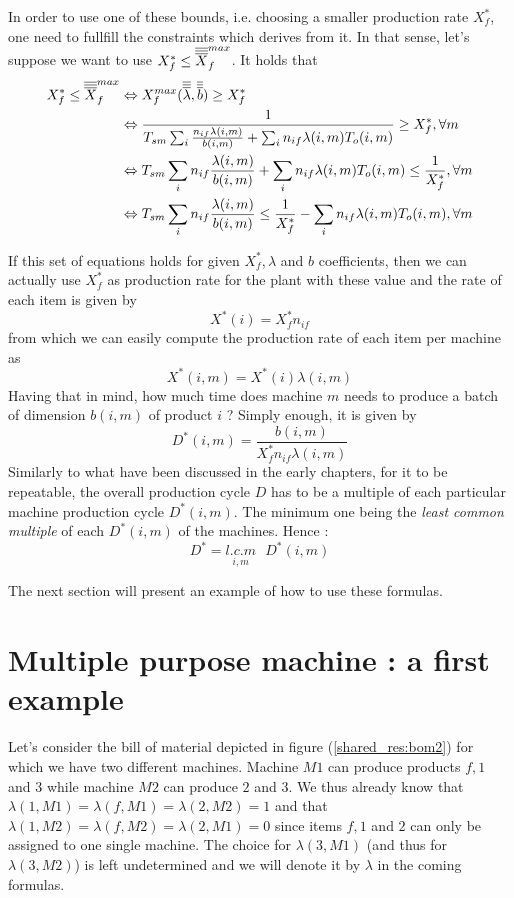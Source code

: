 In order to use one of these bounds, i.e. choosing a smaller production rate $X_f^*$, one need to fullfill the constraints which derives from it. In that sense, let's suppose we want to use $X_f^*\le \overline{\overline{\overline{X}}}_f^{max}$. It holds that 
\[
    \begin{split}
        X_f^*\le \overline{\overline{\overline{X}}}_f^{max}
        &\Leftrightarrow X_f^{max}(\overline{\overline{\overline{\lambda}}}, \overline{\overline{\overline{b}}}) \ge X_f^*\\
        &\Leftrightarrow \frac{1}{ T_{sm}\sum_i\frac{n_{if}\lambda(i,m)}{b(i,m)} + \sum_i n_{if}\lambda(i,m)T_o(i,m) } \ge X_f^*, \forall m\\
        &\Leftrightarrow T_{sm}\sum_i n_{if}\frac{\lambda(i,m)}{b(i,m)} + \sum_i n_{if}\lambda(i,m)T_o(i,m) \le \frac{1}{X_f^*}, \forall m\\
        &\Leftrightarrow T_{sm}\sum_i n_{if}\frac{\lambda(i,m)}{b(i,m)} \le \frac{1}{X_f^*} - \sum_i n_{if}\lambda(i,m)T_o(i,m), \forall m
    \end{split}
\]

If this set of equations holds for given $X_f^*, \lambda$ and $b$ coefficients, then we can actually use $X_f^*$ as production rate for the plant with these value and the rate of each item is given by \[ X^*(i) = X_f^*n_{if} \] from which we can easily compute the production rate of each item per machine as \[ X^*(i,m) = X^*(i)\lambda(i,m) \] Having that in mind, how much time does machine $m$ needs to produce a batch of dimension $b(i,m)$ of product $i$ ? Simply enough, it is given by \[ D^*(i,m) = \frac{b(i,m)}{X_f^*n_{if}\lambda(i,m)} \] Similarly to what have been discussed in the early chapters, for it to be repeatable, the overall production cycle $D$ has to be a multiple of each particular machine production cycle $D^*(i,m)$. The minimum one being the \textit{least common multiple} of each $D^*(i,m)$ of the machines. Hence :
\[ D^* = \underset{i,m}{l.c.m}\textrm{ } D^*(i,m) \]

The next section will present an example of how to use these formulas.

\section{Multiple purpose machine : a first example}

Let's consider the bill of material depicted in figure (\ref{shared_res:bom2}) for which we have two different machines. Machine $M1$ can produce products $f, 1$ and $3$ while machine $M2$ can produce $2$ and $3$. We thus already know that $\lambda(1, M1) = \lambda(f, M1) = \lambda(2, M2) = 1$ and that $\lambda(1, M2) = \lambda(f, M2) = \lambda(2, M1) = 0$ since items $f, 1$ and $2$ can only be assigned to one single machine. The choice for $\lambda(3, M1)$ (and thus for $\lambda(3, M2)$) is left undetermined and we will denote it by $\lambda$ in the coming formulas. 

